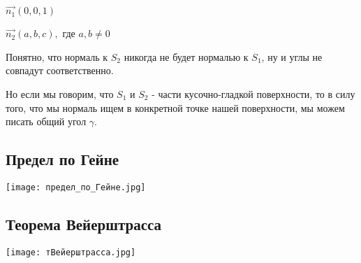 \documentclass[12pt, english]{article}
\begin{document}
	$\vec{n_1}(0 , 0 , 1)$
	
	$\vec{n_2}(a , b , c), $ где $a,b \neq 0$

	Понятно, что нормаль к $S_2$ никогда не будет нормалью к $S_1$, ну и углы не совпадут соответственно.
	
	Но если мы говорим, что $S_1$ и $S_2$ - части кусочно-гладкой поверхности, то в силу того, что мы нормаль ищем в конкретной точке нашей поверхности, мы можем писать общий угол $\gamma$.
\newpage

\subsection{Предел по Гейне} \label{eq201}
	\texttt{[image: предел\_по\_Гейне.jpg]}

\subsection{Теорема Вейерштрасса} \label{eq202}

	\texttt{[image: тВейерштрасса.jpg]}
	
	
\end{document}
